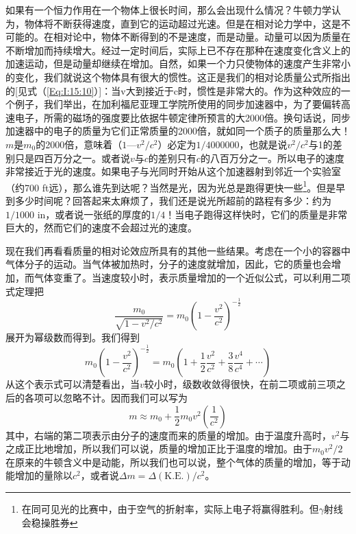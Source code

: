 如果有一个恒力作用在一个物体上很长时间，那么会出现什么情况？牛顿力学认为，物体将不断获得速度，直到它的运动超过光速。但是在相对论力学中，这是不可能的。在相对论中，物体不断得到的不是速度，而是动量。动量可以因为质量在不断增加而持续增大。经过一定时间后，实际上已不存在那种在速度变化含义上的加速运动，但是动量却继续在增加。自然，如果一个力只使物体的速度产生非常小的变化，我们就说这个物体具有很大的惯性。这正是我们的相对论质量公式所指出的[见式（\ref{Eq:I:15:10}）]：当v大到接近于c时，惯性是非常大的。作为这种效应的一个例子，我们举出，在加利福尼亚理工学院所使用的同步加速器中，为了要偏转高速电子，所需的磁场的强度要比依据牛顿定律所预言的大2000倍。换句话说，同步加速器中的电子的质量为它们正常质量的2000倍，就如同一个质子的质量那么大！ $m$是$m_0$的2000倍，意味着（$1—v^2/c^2$）必定为$1/4000000$，也就是说$v^2/c^2$与1的差别只是四百万分之一。或者说$v$与$c$的差别只有$c$的八百万分之一。所以电子的速度非常接近于光的速度。如果电子与光同时开始从这个加速器射到邻近一个实验室（约700 ft远），那么谁先到达呢？当然是光，因为光总是跑得更快一些\footnote{在同可见光的比赛中，由于空气的折射率，实际上电子将赢得胜利。但$\gamma$射线会稳操胜券}。但是早到多少时间呢？回答起来太麻烦了，我们还是说光所超前的路程有多少：约为$1/1000$ in，或者说一张纸的厚度的$1/4$！当电子跑得这样快时，它们的质量是非常巨大的，然而它们的速度不会超过光的速度。

现在我们再看看质量的相对论效应所具有的其他一些结果。考虑在一个小的容器中气体分子的运动。当气体被加热时，分子的速度就增加，因此，它的质量也会增加，而气体变重了。当速度较小时，表示质量增加的一个近似公式，可以利用二项式定理把
\begin{equation*}
    \frac{m_0}{\sqrt{1-v^2/c^2}}=m_0(1-\frac{v^2}{c^2})^{-\frac{1}{2}}
\end{equation*}
展开为幂级数而得到。我们得到
\begin{equation*}
    m_0(1-\frac{v^2}{c^2})^{-\frac{1}{2}}=m_0(1+\frac{1}{2} \frac{v^2}{c^2}+\frac{3}{8} \frac{v^4}{c^4}+\cdots)
\end{equation*}
从这个表示式可以清楚看出，当$v$较小时，级数收敛得很快，在前二项或前三项之后的各项可以忽略不计。因而我们可以写为
\begin{equation}
    \label{Eq:I:15:11}
    m \approx m_0+\frac{1}{2}m_0v^2(\frac{1}{c^2})
\end{equation}
其中，右端的第二项表示由分子的速度而来的质量的增加。由于温度升高时，$v^2$与之成正比地增加，所以我们可以说，质量的增加正比于温度的增加。由于$m_0v^2/2$在原来的牛顿含义中是动能，所以我们也可以说，整个气体的质量的增加，等于动能增加的量除以$c^2$，或者说$\Delta m = \Delta (\text{K.E.})/c^2$。

